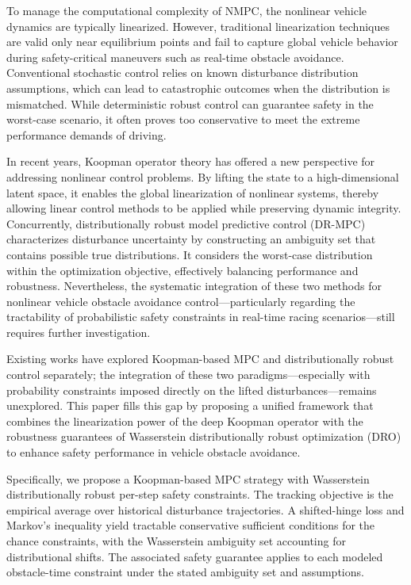 \documentclass[pdflatex,sn-mathphys,Numbered]{sn-jnl}
\numberwithin{equation}{section}
\begin{document}
    To manage the computational complexity of NMPC, the nonlinear vehicle dynamics are typically linearized. However, traditional linearization techniques are valid only near equilibrium points and fail to capture global vehicle behavior during safety-critical maneuvers such as real-time obstacle avoidance. Conventional stochastic control relies on known disturbance distribution assumptions, which can lead to catastrophic outcomes when the distribution is mismatched. While deterministic robust control can guarantee safety in the worst-case scenario, it often proves too conservative to meet the extreme performance demands of driving.

    In recent years, Koopman operator theory has offered a new perspective for addressing nonlinear control problems. By lifting the state to a high-dimensional latent space, it enables the global linearization of nonlinear systems, thereby allowing linear control methods to be applied while preserving dynamic integrity. Concurrently, distributionally robust model predictive control (DR-MPC) characterizes disturbance uncertainty by constructing an ambiguity set that contains possible true distributions. It considers the worst-case distribution within the optimization objective, effectively balancing performance and robustness. Nevertheless, the systematic integration of these two methods for nonlinear vehicle obstacle avoidance control—particularly regarding the tractability of probabilistic safety constraints in real-time racing scenarios—still requires further investigation.

    Existing works have explored Koopman-based MPC \citep{zhang2021, zhang2022, zheng2024} and distributionally robust control \citep{esfahani2018, li2021, hakobyan2023} separately; the integration of these two paradigms—especially with probability constraints imposed directly on the lifted disturbances—remains unexplored. This paper fills this gap by proposing a unified framework that combines the linearization power of the deep Koopman operator with the robustness guarantees of Wasserstein distributionally robust optimization (DRO) to enhance safety performance in vehicle obstacle avoidance.

	Specifically, we propose a Koopman-based MPC strategy with Wasserstein distributionally robust per-step safety constraints. The tracking objective is the empirical average over historical disturbance trajectories. A shifted-hinge loss and Markov's inequality yield tractable conservative sufficient conditions for the chance constraints, with the Wasserstein ambiguity set accounting for distributional shifts. The associated safety guarantee applies to each modeled obstacle-time constraint under the stated ambiguity set and assumptions.
	
\end{document}
